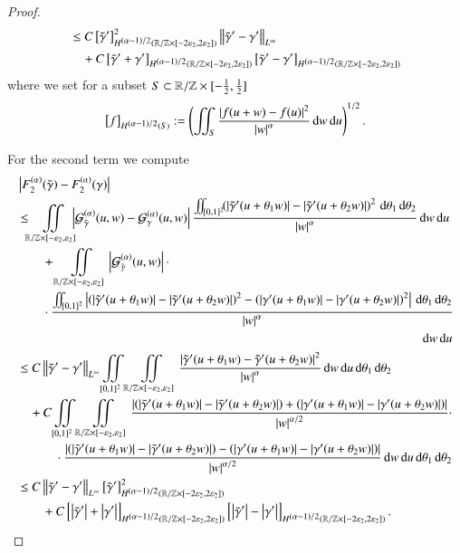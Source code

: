 \begin{proof}
\begin{align*}
  &\le C\seminorm{\dgt}_{\W[(\a-1)/2](\R/\Z\times[-2\eps_2,2\eps_2])}^2\norm{\dgt-\dg}_{L^\infty}  \\
  &\quad + C \seminorm{\dgt+\dg}_{\W[(\a-1)/2](\R/\Z\times[-2\eps_2,2\eps_2])}\seminorm{\dgt-\dg}_{\W[(\a-1)/2](\R/\Z\times[-2\eps_2,2\eps_2])}
 \end{align*}
 where we set for a subset $S\subset\R/\Z\times[-\frac12,\frac12]$
 \begin{equation*}
  \seminorm{f}_{\W[(\a-1)/2](S)}
  := \left( \iint_{S} \frac{\abs{f(u+w)-f(u)}^2}{\abs w^{\a}} \d w\d u\right)^{1/2}.
 \end{equation*}

 For the second term we compute
 \begin{align*}
  &\abs{F_2^{(\alpha)}(\gt)-F_2^{(\alpha)}(\g)} \\
  &\le \! \! \iint\limits_{\R/\Z\times[-\eps_2,\eps_2]} \! \! \! \!\abs{\G[\gt](u,w)-\G(u,w)}\frac{\iint_{[0,1]^2} \!\! \br{\abs{\dgt(u+\theta_1w)}-\abs{\dgt(u+\theta_2w)}}^2\d\theta_1\d\theta_2}{\abs w^\alpha}\d w\d u \\
  &\qquad{}+\iint\limits_{\R/\Z\times[-\eps_2,\eps_2]}\abs{\G[\gt](u,w)} \cdot\\
  &\qquad \cdot\frac{\iint_{[0,1]^2}\abs{\br{\abs{\dgt(u+\theta_1w)}-\abs{\dgt(u+\theta_2w)}}^2-\br{\abs{\dg(u+\theta_1w)}-\abs{\dg(u+\theta_2w)}}^2}\d\theta_1\d\theta_2}{\abs w^\alpha}\\
  & \hspace{11.2cm} \d w\d u \\
  &\le C\norm{\dgt-\dg}_{L^\infty}\iint\limits_{[0,1]^2}\iint\limits_{\R/\Z\times[-\eps_2,\eps_2]}\frac{\abs{\dgt(u+\theta_1w)-\dgt(u+\theta_2w)}^2}{\abs w^\alpha}\d w\d u\d\theta_1\d\theta_2 \\
  &\quad{}+C\iint\limits_{[0,1]^2}\iint\limits_{\R/\Z\times[-\eps_2,\eps_2]}\frac{\abs{\br{\abs{\dgt(u+\theta_1w)}-\abs{\dgt(u+\theta_2w)}}+\br{\abs{\dg(u+\theta_1w)}-\abs{\dg(u+\theta_2w)}}}}{\abs w^{\alpha/2}}\cdot \\
  &\qquad\quad{}\cdot\frac{\abs{\br{\abs{\dgt(u+\theta_1w)}-\abs{\dgt(u+\theta_2w)}}-\br{\abs{\dg(u+\theta_1w)}-\abs{\dg(u+\theta_2w)}}}}{\abs w^{\alpha/2}}\d w\d u\d\theta_1\d\theta_2 \\
  &\le C\norm{\dgt-\dg}_{L^\infty}\seminorm{\dgt}_{\W[(\a-1)/2](\R/\Z\times[-2\eps_2,2\eps_2])}^2 \\
  &\qquad + C\seminorm{\abs\dgt+\abs\dg}_{\W[(\a-1)/2](\R/\Z\times[-2\eps_2,2\eps_2])}\seminorm{\abs\dgt-\abs\dg}_{\W[(\a-1)/2](\R/\Z\times[-2\eps_2,2\eps_2])}.
 \end{align*}


\end{proof}
